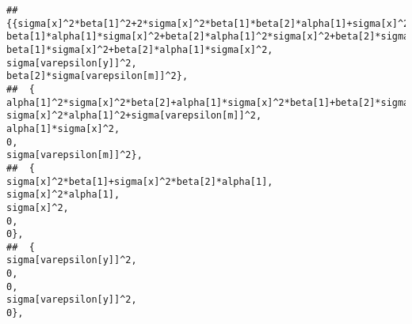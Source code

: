 \documentclass[
]{book}
\theoremstyle{definition}
\theoremstyle{definition}
\theoremstyle{definition}
\theoremstyle{remark}
\begin{document}
\begin{verbatim}
## {{sigma[x]^2*beta[1]^2+2*sigma[x]^2*beta[1]*beta[2]*alpha[1]+sigma[x]^2*beta[2]^2*alpha[1]^2+beta[2]^2*sigma[varepsilon[m]]^2+sigma[varepsilon[y]]^2,                                                           beta[1]*alpha[1]*sigma[x]^2+beta[2]*alpha[1]^2*sigma[x]^2+beta[2]*sigma[varepsilon[m]]^2,                                                                                                     beta[1]*sigma[x]^2+beta[2]*alpha[1]*sigma[x]^2,                                                                                                                             sigma[varepsilon[y]]^2,                                                                                                                     beta[2]*sigma[varepsilon[m]]^2},
##  {                                                          alpha[1]^2*sigma[x]^2*beta[2]+alpha[1]*sigma[x]^2*beta[1]+beta[2]*sigma[varepsilon[m]]^2,                                                                                                       sigma[x]^2*alpha[1]^2+sigma[varepsilon[m]]^2,                                                                                                                                alpha[1]*sigma[x]^2,                                                                                                                                                  0,                                                                                                                             sigma[varepsilon[m]]^2},
##  {                                                                                                    sigma[x]^2*beta[1]+sigma[x]^2*beta[2]*alpha[1],                                                                                                                                sigma[x]^2*alpha[1],                                                                                                                                         sigma[x]^2,                                                                                                                                                  0,                                                                                                                                                  0},
##  {                                                                                                                            sigma[varepsilon[y]]^2,                                                                                                                                                  0,                                                                                                                                                  0,                                                                                                                             sigma[varepsilon[y]]^2,                                                                                                                                                  0},

\end{verbatim}
\end{document}
